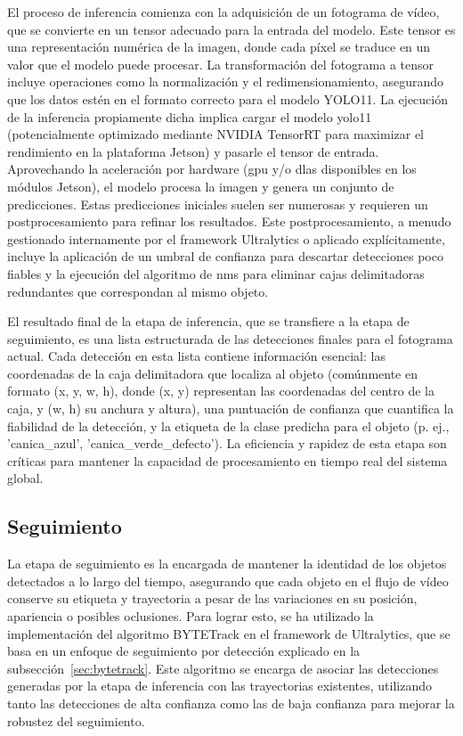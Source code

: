 \documentclass[11pt,spanish,listoffigures,listoftables]{tfgetsinf}
\begin{document}
El proceso de inferencia comienza con la adquisición de un fotograma de vídeo, que se convierte en un tensor adecuado para la entrada del modelo. Este tensor es una representación numérica de la imagen, donde cada píxel se traduce en un valor que el modelo puede procesar. La transformación del fotograma a tensor incluye operaciones como la normalización y el redimensionamiento, asegurando que los datos estén en el formato correcto para el modelo YOLO11.
La ejecución de la inferencia propiamente dicha implica cargar el modelo \gls{yolo}11 (potencialmente optimizado mediante NVIDIA TensorRT para maximizar el rendimiento en la plataforma Jetson) y pasarle el tensor de entrada. Aprovechando la aceleración por hardware (\gls{gpu} y/o \gls{dla}s disponibles en los módulos Jetson), el modelo procesa la imagen y genera un conjunto de predicciones. Estas predicciones iniciales suelen ser numerosas y requieren un postprocesamiento para refinar los resultados. Este postprocesamiento, a menudo gestionado internamente por el framework Ultralytics o aplicado explícitamente, incluye la aplicación de un umbral de confianza para descartar detecciones poco fiables y la ejecución del algoritmo de \gls{nms} para eliminar cajas delimitadoras redundantes que correspondan al mismo objeto.

El resultado final de la etapa de inferencia, que se transfiere a la etapa de seguimiento, es una lista estructurada de las detecciones finales para el fotograma actual. Cada detección en esta lista contiene información esencial: las coordenadas de la caja delimitadora que localiza al objeto (comúnmente en formato (x, y, w, h), donde (x, y) representan las coordenadas del centro de la caja, y (w, h) su anchura y altura), una puntuación de confianza que cuantifica la fiabilidad de la detección, y la etiqueta de la clase predicha para el objeto (p. ej., 'canica\_azul', 'canica\_verde\_defecto'). La eficiencia y rapidez de esta etapa son críticas para mantener la capacidad de procesamiento en tiempo real del sistema global.

\subsection{Seguimiento} \label{sec:seguimiento}
La etapa de seguimiento es la encargada de mantener la identidad de los objetos detectados a lo largo del tiempo, asegurando que cada objeto en el flujo de vídeo conserve su etiqueta y trayectoria a pesar de las variaciones en su posición, apariencia o posibles oclusiones. Para lograr esto, se ha utilizado la implementación del algoritmo BYTETrack en el framework de Ultralytics\cite{Jocher_Ultralytics_YOLO_2023}, que se basa en un enfoque de seguimiento por detección explicado en la subsección~\ref{sec:bytetrack}. Este algoritmo se encarga de asociar las detecciones generadas por la etapa de inferencia con las trayectorias existentes, utilizando tanto las detecciones de alta confianza como las de baja confianza para mejorar la robustez del seguimiento.
\end{document}

